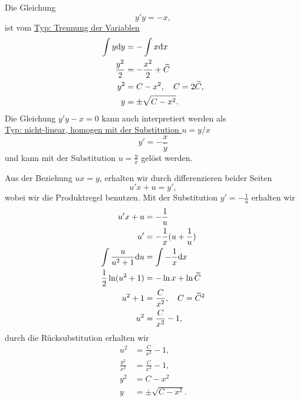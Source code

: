 {\begin{itemize}
Die Gleichung
$$
y'y = -x,
$$
ist vom \underline{Typ: Trennung der Variablen}
\begin{align*}
\int y \mathrm{d} y &= -\int x \mathrm{d} x\\
\frac{y^2}{2} &= -\frac{x^2}{2}+\widetilde C\\
y^2 &= C-x^2, \quad C = 2\widetilde C,\\
y &= \pm \sqrt{C-x^2}.
\end{align*}
Die Gleichung $y'y-x=0$ kann auch interpretiert werden als\\
\underline{Typ: nicht-linear, homogen mit der Substitution $u=y/x$}
$$
y' = -\frac{x}{y}
$$ 
und kann mit der Substitution $u=\frac{y}{x}$ gelöst werden.

Aus der Beziehung $ux = y$, erhalten wir durch differenzieren beider Seiten
$$
u' x + u = y',
$$
wobei wir die Produktregel benutzen.
Mit der Substitution $y'=-\frac{1}{u}$ erhalten wir
\begin{align*}
u'x + u &= - \frac{1}{u}\\
u' &= -\frac{1}{x} (u+\frac{1}{u})\\
\int \frac{u}{u^2+1}\mathrm{d} u &= \int -\frac{1}{x}\mathrm{d} x\\
\frac{1}{2}\ln (u^2+1) &= -\ln x + \ln \widetilde C\\
u^2+1 &= \frac{C}{x^2}, \quad C=\widetilde C^2\\
u^2 &= \frac{C}{x^2}-1,
\end{align*}
durch die Rücksubstitution erhalten wir
\begin{align*}
u^2 &= \frac{C}{x^2}-1,\\
\frac{y^2}{x^2} &= \frac{C}{x^2}-1,\\
y^2 & = C -x^2\\
y&=\pm \sqrt{C-x^2}.
\end{align*}


\end{itemize}}
